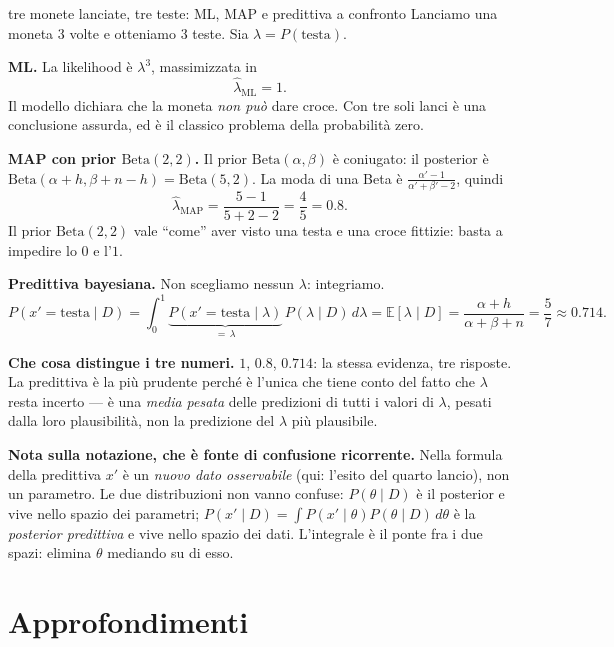 \begin{esempiosvolto}{tre monete lanciate, tre teste: ML, MAP e predittiva a confronto}
Lanciamo una moneta $3$ volte e otteniamo $3$ teste. Sia $\lambda = P(\text{testa})$.

\medskip
\textbf{ML.} La likelihood è $\lambda^3$, massimizzata in
\[
\hat\lambda_{\text{ML}} = 1.
\]
Il modello dichiara che la moneta \emph{non può} dare croce. Con tre soli lanci è una conclusione assurda, ed è il classico problema della probabilità zero.

\medskip
\textbf{MAP con prior $\text{Beta}(2,2)$.} Il prior $\text{Beta}(\alpha,\beta)$ è coniugato: il posterior è $\text{Beta}(\alpha + h, \beta + n - h) = \text{Beta}(5, 2)$. La moda di una Beta è $\frac{\alpha' - 1}{\alpha' + \beta' - 2}$, quindi
\[
\hat\lambda_{\text{MAP}} = \frac{5-1}{5+2-2} = \frac{4}{5} = 0.8.
\]
Il prior $\text{Beta}(2,2)$ vale ``come'' aver visto una testa e una croce fittizie: basta a impedire lo $0$ e l'$1$.

\medskip
\textbf{Predittiva bayesiana.} Non scegliamo nessun $\lambda$: integriamo.
\[
P(x' = \text{testa} \mid D) = \int_0^1 \underbrace{P(x' = \text{testa} \mid \lambda)}_{=\,\lambda} \, P(\lambda \mid D)\, d\lambda
= \mathbb{E}[\lambda \mid D] = \frac{\alpha + h}{\alpha + \beta + n} = \frac{5}{7} \approx 0.714.
\]

\medskip
\textbf{Che cosa distingue i tre numeri.} $1$, $0.8$, $0.714$: la stessa evidenza, tre risposte. La predittiva è la più prudente perché è l'unica che tiene conto del fatto che $\lambda$ resta incerto — è una \emph{media pesata} delle predizioni di tutti i valori di $\lambda$, pesati dalla loro plausibilità, non la predizione del $\lambda$ più plausibile.

\textbf{Nota sulla notazione, che è fonte di confusione ricorrente.} Nella formula della predittiva $x'$ è un \emph{nuovo dato osservabile} (qui: l'esito del quarto lancio), non un parametro. Le due distribuzioni non vanno confuse: $P(\theta \mid D)$ è il posterior e vive nello spazio dei parametri; $P(x' \mid D) = \int P(x' \mid \theta) P(\theta \mid D)\, d\theta$ è la \emph{posterior predittiva} e vive nello spazio dei dati. L'integrale è il ponte fra i due spazi: elimina $\theta$ mediando su di esso.
\end{esempiosvolto}

\section{Approfondimenti}

